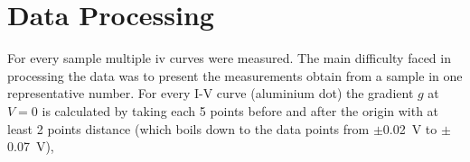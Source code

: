 \section{Data Processing}
\label{sec:eval}
For every sample multiple \gls{iv} curves were measured. 
The main difficulty faced in processing the data was to present the measurements obtain 
from a sample in one representative number. 
%
%
For every I-V curve (aluminium dot) the gradient $g$ at $V=0$ is calculated by taking 
each 5 points before and after the origin with at least 2 points distance (which boils
down to the data points from $\pm$\SI{0.02}{\volt} to $\pm$\SI{0.07}{\volt}), 
